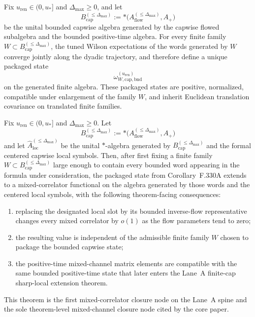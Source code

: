 \begin{corollary}
Fix $u_{\mathrm{ren}}\in(0,u_\ast]$ and $\Delta_{\max}\ge 0$, and let
\[
B_{\mathrm{cap}}^{(\le \Delta_{\max})}:=\ast\bigl(A_{\mathrm{flow}}^{(\le \Delta_{\max})},A_+\bigr)
\]
be the unital bounded capwise algebra generated by the capwise flowed subalgebra and the bounded positive-time algebra. For every finite family $W\subset B_{\mathrm{cap}}^{(\le \Delta_{\max})}$, the tuned Wilson expectations of the words generated by $W$ converge jointly along the dyadic trajectory, and therefore define a unique packaged state
\[
\omega^{(u_{\mathrm{ren}})}_{W,\mathrm{cap},\mathrm{bnd}}
\]
on the generated finite algebra. These packaged states are positive, normalized, compatible under enlargement of the family $W$, and inherit Euclidean translation covariance on translated finite families.
\end{corollary}

\begin{theorem}
Fix $u_{\mathrm{ren}}\in(0,u_\ast]$ and $\Delta_{\max}\ge 0$. Let
\[
B_{\mathrm{cap}}^{(\le \Delta_{\max})}:=\ast\bigl(A_{\mathrm{flow}}^{(\le \Delta_{\max})},A_+\bigr)
\]
and let $\widehat A_{\mathrm{loc}}^{(\le \Delta_{\max})}$ be the unital $\ast$-algebra generated by $B_{\mathrm{cap}}^{(\le \Delta_{\max})}$ and the formal centered capwise local symbols. Then, after first fixing a finite family $W\subset B_{\mathrm{cap}}^{(\le \Delta_{\max})}$ large enough to contain every bounded word appearing in the formula under consideration, the packaged state from Corollary~F.330A extends to a mixed-correlator functional on the algebra generated by those words and the centered local symbols, with the following theorem-facing consequences:
\begin{enumerate}[label=(\roman*),leftmargin=2.2em]
\item replacing the designated local slot by its bounded inverse-flow representative changes every mixed correlator by $o(1)$ as the flow parameters tend to zero;
\item the resulting value is independent of the admissible finite family $W$ chosen to package the bounded capwise state;
\item the positive-time mixed-channel matrix elements are compatible with the same bounded positive-time state that later enters the Lane~A finite-cap sharp-local extension theorem.
\end{enumerate}
This theorem is the first mixed-correlator closure node on the Lane~A spine and the sole theorem-level mixed-channel closure node cited by the core paper.
\end{theorem}

